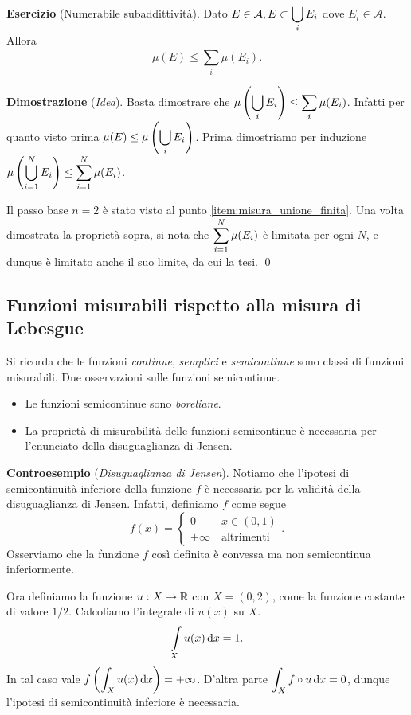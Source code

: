 \documentclass[a4paper, 12pt]{report}
\begin{document}
\textbf{Esercizio} (Numerabile subaddittività).
Dato $\displaystyle E \in \mathcal{A}, E \subset \bigcup_i E_i$ dove $E_i \in \mathcal{A}$. Allora
$$
	\mu(E) \leq \sum_{i}^{} \mu(E_i).
$$

\textbf{Dimostrazione} (\textit{Idea}).
Basta dimostrare che $\displaystyle \mu \left( \bigcup_i E_i \right) \leq \sum_{i}^{} \mu(E_i)$. Infatti per quanto visto prima $\displaystyle \mu(E) \leq \mu \left( \bigcup_i E_i \right)$. Prima dimostriamo per induzione $\displaystyle \mu \left( \bigcup_{i = 1}^N E_i \right) \leq \sum_{i=1}^{N} \mu(E_i)$. 

Il passo base $n = 2$ è stato visto al punto \ref{item:misura_unione_finita}. Una volta dimostrata la proprietà sopra, si nota che $\displaystyle \sum_{i=1}^{N} \mu(E_i) $ è limitata per ogni $N$, e dunque è limitato anche il suo limite, da cui la tesi.
\qed

\subsection*{Funzioni misurabili rispetto alla misura di Lebesgue}

Si ricorda che le funzioni \textit{continue}, \textit{semplici} e \textit{semicontinue} sono classi di funzioni misurabili.
Due osservazioni sulle funzioni semicontinue.
\begin{itemize}
\item Le funzioni semicontinue sono \textit{boreliane}.

\item La proprietà di misurabilità delle funzioni semicontinue è necessaria per l'enunciato della disuguaglianza di Jensen.
\end{itemize}

\textbf{Controesempio} (\textit{Disuguaglianza di Jensen}).
Notiamo che l'ipotesi di semicontinuità inferiore della funzione $f$ è necessaria per la validità della disuguaglianza di Jensen.
Infatti, definiamo $f$ come segue
%
$$
f(x) = 
\begin{cases}
0 \qquad \; x \in (0,1) \\
+ \infty \quad \text{altrimenti} 
\end{cases}.
$$
%
Osserviamo che la funzione $f$ così definita è convessa ma non semicontinua inferiormente.

Ora definiamo la funzione $u : X \to \mathbb R$ con $X = (0,2)$, come la funzione costante di valore $1/2$.
Calcoliamo l'integrale di $u(x)$ su $X$.
%
$$
	\int\limits_{\mathclap{X}} u(x) \dd x = 1. 
$$
%
In tal caso vale $\displaystyle f \left( \int_X u(x) \,\mathrm{d} x \right) = + \infty$.
D'altra parte $\displaystyle \int_X f \circ u \,\mathrm{d} x = 0$, dunque l'ipotesi di semicontinuità inferiore è necessaria.
\end{document}
